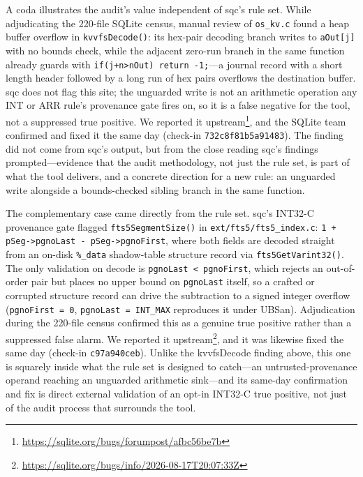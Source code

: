 A coda illustrates the audit's value independent of sqc's rule set.
While adjudicating the 220-file SQLite census, manual review of
\texttt{os\_kv.c} found a heap buffer overflow in
\texttt{kvvfsDecode()}: its hex-pair decoding branch writes to
\texttt{aOut[j]} with no bounds check, while the adjacent zero-run
branch in the same function already guards with \texttt{if(j+n>nOut)
return -1;}---a journal record with a short length header followed by
a long run of hex pairs overflows the destination buffer.  sqc does
not flag this site; the unguarded write is not an arithmetic operation
any INT or ARR rule's provenance gate fires on, so it is a false
negative for the tool, not a suppressed true positive.  We reported it
upstream\footnote{\url{https://sqlite.org/bugs/forumpost/afbc56be7b}},
and the SQLite team confirmed and fixed it the same day (check-in
\texttt{732c8f81b5a91483}).  The finding did not come from sqc's
output, but from the close reading sqc's findings prompted---evidence
that the audit methodology, not just the rule set, is part of what the
tool delivers, and a concrete direction for a new rule: an unguarded
write alongside a bounds-checked sibling branch in the same function.

The complementary case came directly from the rule set.  sqc's INT32-C
provenance gate flagged \texttt{fts5SegmentSize()} in
\texttt{ext/fts5/fts5\_index.c}: \texttt{1 + pSeg->pgnoLast -
pSeg->pgnoFirst}, where both fields are decoded straight from an
on-disk \texttt{\%\_data} shadow-table structure record via
\texttt{fts5GetVarint32()}.  The only validation on decode is
\texttt{pgnoLast < pgnoFirst}, which rejects an out-of-order pair but
places no upper bound on \texttt{pgnoLast} itself, so a crafted or
corrupted structure record can drive the subtraction to a signed
integer overflow (\texttt{pgnoFirst = 0}, \texttt{pgnoLast = INT\_MAX}
reproduces it under UBSan).  Adjudication during the 220-file census
confirmed this as a genuine true positive rather than a suppressed
false alarm.  We reported it
upstream\footnote{\url{https://sqlite.org/bugs/info/2026-08-17T20:07:33Z}},
and it was likewise fixed the same day (check-in
\texttt{c97a940ceb}).  Unlike the kvvfsDecode finding above, this one
is squarely inside what the rule set is designed to catch---an
untrusted-provenance operand reaching an unguarded arithmetic
sink---and its same-day confirmation and fix is direct external
validation of an opt-in INT32-C true positive, not just of the audit
process that surrounds the tool.
